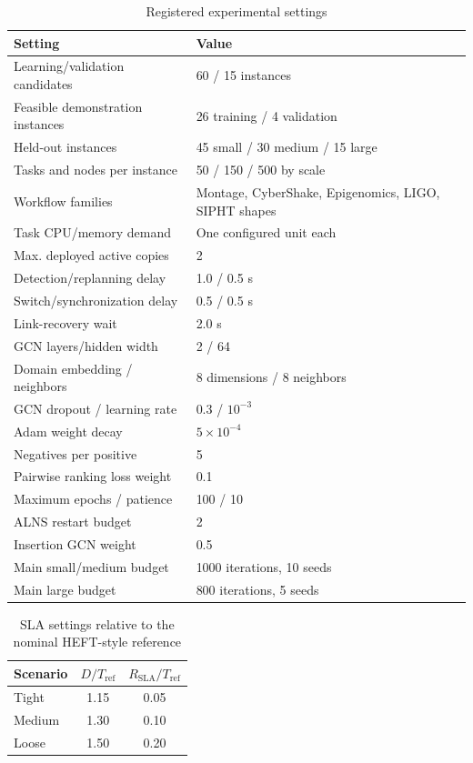 \begin{table}[!t]
\caption{Registered experimental settings}
\label{tab:settings}
\centering
\footnotesize
\begin{tabular}{@{}p{}p{}@{}}
\toprule
Setting & Value \\
\midrule
Learning/validation candidates & 60 / 15 instances \\
Feasible demonstration instances & 26 training / 4 validation \\
Held-out instances & 45 small / 30 medium / 15 large \\
Tasks and nodes per instance & 50 / 150 / 500 by scale \\
Workflow families & Montage, CyberShake, Epigenomics, LIGO, SIPHT shapes \\
Task CPU/memory demand & One configured unit each \\
Max. deployed active copies & 2 \\
Detection/replanning delay & 1.0 / 0.5 s \\
Switch/synchronization delay & 0.5 / 0.5 s \\
Link-recovery wait & 2.0 s \\
GCN layers/hidden width & 2 / 64 \\
Domain embedding / neighbors & 8 dimensions / 8 neighbors \\
GCN dropout / learning rate & 0.3 / $10^{-3}$ \\
Adam weight decay & $5\times10^{-4}$ \\
Negatives per positive & 5 \\
Pairwise ranking loss weight & 0.1 \\
Maximum epochs / patience & 100 / 10 \\
ALNS restart budget & 2 \\
Insertion GCN weight & 0.5 \\
Main small/medium budget & 1000 iterations, 10 seeds \\
Main large budget & 800 iterations, 5 seeds \\
\bottomrule
\end{tabular}
\end{table}

\begin{table}[!t]
\caption{SLA settings relative to the nominal HEFT-style reference}
\label{tab:sla}
\centering
\begin{tabular}{lcc}
\toprule
Scenario & $D/T_{\mathrm{ref}}$ & $R_{\mathrm{SLA}}/T_{\mathrm{ref}}$ \\
\midrule
Tight & 1.15 & 0.05 \\
Medium & 1.30 & 0.10 \\
Loose & 1.50 & 0.20 \\
\bottomrule
\end{tabular}
\end{table}
